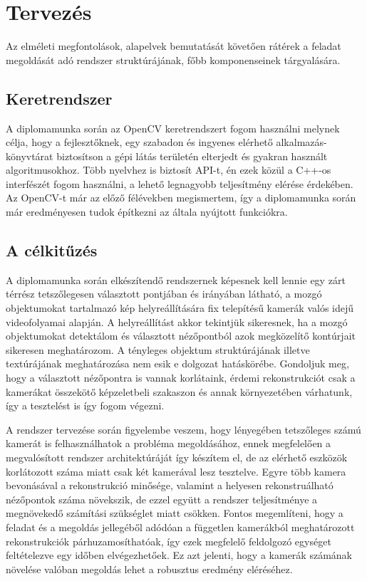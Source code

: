 \chapter{Tervezés}

Az elméleti megfontolások, alapelvek bemutatását követően rátérek a feladat megoldását adó rendszer struktúrájának, főbb komponenseinek tárgyalására.

\section{Keretrendszer}

A diplomamunka során az OpenCV \cite{opencv} keretrendszert fogom használni melynek célja, hogy a fejlesztőknek, egy szabadon és ingyenes elérhető alkalmazás-könyvtárat biztosítson a gépi látás területén elterjedt és gyakran használt algoritmusokhoz. Több nyelvhez is biztosít API-t, én ezek közül a C++-os interfészét fogom használni, a lehető legnagyobb teljesítmény elérése érdekében. Az OpenCV-t már az előző félévekben megismertem, így a diplomamunka során már eredményesen tudok építkezni az általa nyújtott funkciókra.

\section{A célkitűzés}

A diplomamunka során elkészítendő rendszernek képesnek kell lennie egy zárt térrész tetszőlegesen választott pontjában és irányában látható, a mozgó objektumokat tartalmazó kép helyreállítására fix telepítésű kamerák valós idejű videofolyamai alapján. A helyreállítást akkor tekintjük sikeresnek, ha a mozgó objektumokat detektálom és választott nézőpontból azok megközelítő kontúrjait sikeresen meghatározom. A tényleges objektum struktúrájának illetve textúrájának meghatározása nem esik e dolgozat hatáskörébe. Gondoljuk meg, hogy a választott nézőpontra is vannak korlátaink, érdemi rekonstrukciót csak a kamerákat összekötő képzeletbeli szakaszon és annak környezetében várhatunk, így a tesztelést is így fogom végezni.

A rendszer tervezése során figyelembe veszem, hogy lényegében tetszőleges számú kamerát is felhasználhatok a probléma megoldásához, ennek megfelelően a megvalósított rendszer architektúráját így készítem el, de az elérhető eszközök korlátozott száma miatt csak két kamerával lesz tesztelve. Egyre több kamera bevonásával a rekonstrukció minősége, valamint a helyesen rekonstruálható nézőpontok száma növekszik, de ezzel együtt a rendszer teljesítménye a megnövekedő számítási szükséglet miatt csökken. Fontos megemlíteni, hogy a feladat és a megoldás jellegéből adódóan a független kamerákból meghatározott rekonstrukciók párhuzamosíthatóak, így ezek megfelelő feldolgozó egységet feltételezve egy időben elvégezhetőek. Ez azt jelenti, hogy a kamerák számának növelése valóban megoldás lehet a robusztus eredmény eléréséhez.

